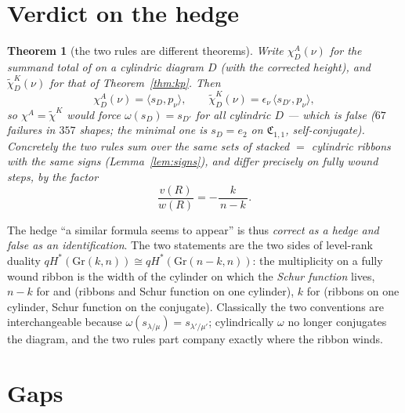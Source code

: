 \documentclass[11pt]{article}
\theoremstyle{plain}
\newtheorem{theorem}{Theorem}
\theoremstyle{definition}
\theoremstyle{remark}
\newcommand{\CC}{\mathfrak{C}}
\begin{document}
\section{Verdict on the hedge}\label{sec:verdict}

\begin{theorem}[the two rules are different theorems]\label{thm:verdict}
Write $\chi^{A}_D(\nu)$ for the summand total of \cite[\texttt{thm:cylindricMNRule}]{AKO} on a
cylindric diagram $D$ (with the corrected height), and $\tilde\chi^{K}_D(\nu)$ for that of
Theorem~\ref{thm:kp}. Then
\[
  \chi^{A}_D(\nu)=\langle s_D,p_\nu\rangle,\qquad
  \tilde\chi^{K}_D(\nu)=\epsilon_\nu\,\langle s_{D'},p_\nu\rangle,
\]
so $\chi^{A}=\tilde\chi^{K}$ would force $\omega(s_D)=s_{D'}$ for all cylindric $D$ --- which is
false ($67$ failures in $357$ shapes; the minimal one is $s_D=e_2$ on $\CC_{1,1}$, self-conjugate).
Concretely the two rules sum over the \emph{same} sets of stacked $=$ cylindric ribbons with the
\emph{same} signs (Lemma~\ref{lem:signs}), and differ precisely on fully wound steps, by the factor
\[
  \frac{v(R)}{w(R)}=-\frac{k}{\,n-k\,}.
\]
\end{theorem}

The hedge ``a similar formula seems to appear'' is thus \emph{correct as a hedge and false as an
identification}. The two statements are the two sides of level-rank duality
$qH^*(\mathrm{Gr}(k,n))\cong qH^*(\mathrm{Gr}(n-k,n))$: the multiplicity on a fully wound ribbon is
the width of the cylinder on which the \emph{Schur function} lives, $n-k$ for \cite{AKO} and
\cite{K19} (ribbons and Schur function on one cylinder), $k$ for \cite{KP} (ribbons on one cylinder,
Schur function on the conjugate). Classically the two conventions are interchangeable because
$\omega(s_{\lambda/\mu})=s_{\lambda'/\mu'}$; cylindrically $\omega$ no longer conjugates the diagram,
and the two rules part company exactly where the ribbon winds.

\section{Gaps}
\end{document}
